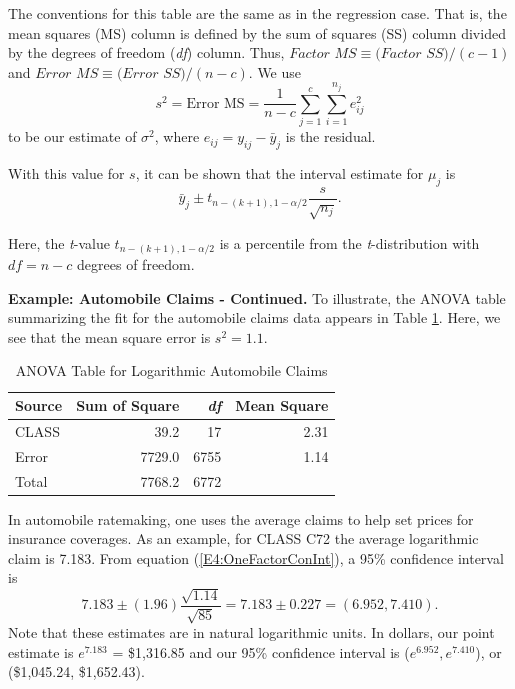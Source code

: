 \noindent The conventions for this table are the same as in the
regression case. That is, the mean squares (MS) column is defined by
the sum of squares (SS) column divided by the degrees of freedom
(\textit{df}) column. Thus, $Factor$ $MS\equiv (Factor$ $SS)/(c-1)$
and $Error$ $MS\equiv (Error$ $SS)/(n-c)$. We use
\begin{equation*}
s^2=\text{Error MS}=\frac{1}{n-c} \sum_{j=1}^{c}\sum_{i=1}^{n_j}
e_{ij}^2
\end{equation*}
to be our estimate of $\sigma^2$, where $e_{ij}=y_{ij}-\bar{y}_j$ is
the residual.

With this value for $s$, it can be shown that the interval estimate
for $\mu_j$ is
\begin{equation}\label{E4:OneFactorConInt}
\bar{y}_j \pm t_{n-(k+1),1-\alpha /2}\frac{s}{\sqrt{n_j}}.
\end{equation}

\noindent Here, the \textit{t}-value $t_{n-(k+1),1-\alpha /2}$ is a percentile from the
\textit{t}-distribution with $df=n-c$ degrees of freedom.

\linejed {}

\textbf{Example: Automobile Claims - Continued.} To illustrate, the ANOVA table summarizing
the fit for the automobile claims data appears in Table \ref{T4:ANOVAAuto}. Here, we see that the
mean square error is $s^2 = 1.1.$

\begin{table}[h]
\caption{\label{T4:ANOVAAuto} ANOVA Table for Logarithmic Automobile
Claims}
\begin{tabular}{lrrr}
\hline Source & Sum of Square & \textit{df} & Mean Square \\
\hline
CLASS & 39.2 & 17 & 2.31\\
Error  & 7729.0 & 6755& 1.14\\
Total  & 7768.2  & 6772 & \\
\hline
\end{tabular}
\end{table}

In automobile ratemaking, one uses the average claims to help set
prices for insurance coverages. As an example, for CLASS C72 the
average logarithmic claim is 7.183. From equation
(\ref{E4:OneFactorConInt}), a 95\% confidence interval is
\begin{equation*}
7.183 \pm (1.96) \frac{\sqrt{1.14}}{\sqrt{85}} = 7.183 \pm 0.227 =
(6.952 ,7.410).\end{equation*} Note that these estimates are in
natural logarithmic units. In dollars, our point estimate is
$e^{7.183}$ = \$1,316.85 and our 95\% confidence interval is
($e^{6.952} ,e^{7.410}$), or (\$1,045.24, \$1,652.43).


